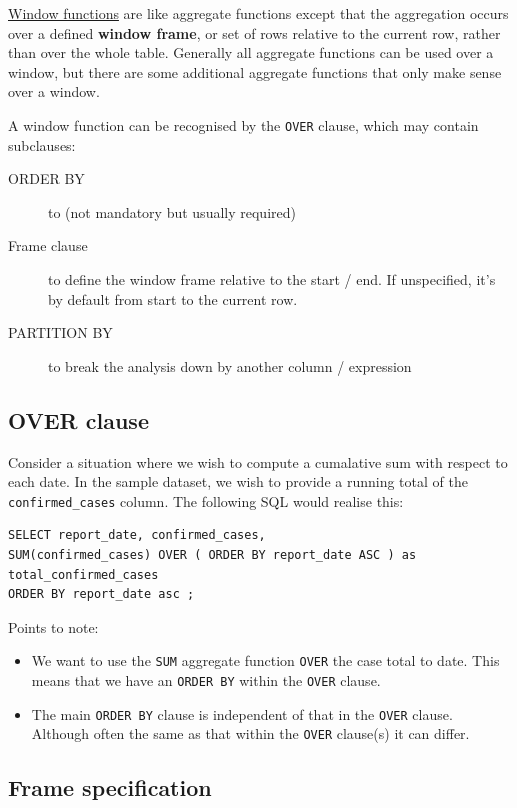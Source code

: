 \documentclass{pgnotes}
\begin{document}
\href{https://www.postgresql.org/docs/13/tutorial-window.html}{Window functions} are like aggregate functions except that the aggregation occurs over a defined \textbf{window frame}, or set of rows relative to the current row, rather than over the whole table.
Generally all aggregate functions can be used over a window, but there are some additional aggregate functions that only make sense over a window. 

A window function can be recognised by the \texttt{OVER} clause, which may contain subclauses:
\begin{description}
\item[ORDER BY] to  (not mandatory but usually required)
\item[Frame clause] to define the window frame relative to the start / end.  If unspecified, it's by default from start to the current row.
\item[PARTITION BY] to break the analysis down by another column / expression
\end{description}

\subsection{OVER clause}

Consider a situation where we wish to compute a cumalative sum with respect to each date.
In the sample dataset, we wish to provide a running total of the \texttt{confirmed\_cases} column.
The following SQL would realise this: 

\begin{verbatim}
SELECT report_date, confirmed_cases,
SUM(confirmed_cases) OVER ( ORDER BY report_date ASC ) as total_confirmed_cases
ORDER BY report_date asc ;
\end{verbatim}
Points to note:
\begin{itemize}
\item
  We want to use the \texttt{SUM} aggregate function \texttt{OVER} the case total to date.
  This means that we have an \texttt{ORDER BY} within the \texttt{OVER} clause.
\item 
  The main \texttt{ORDER BY} clause is independent of that in the \texttt{OVER} clause.
  Although often the same as that within the \texttt{OVER} clause(s) it can differ.
\end{itemize}

\subsection{Frame specification}
\end{document}
